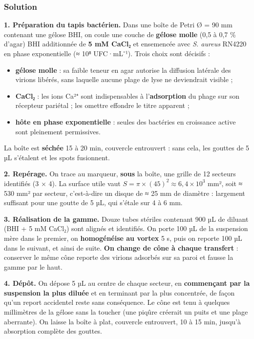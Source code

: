 \documentclass[11pt,a4paper]{article}
\providecommand{\tightlist}{\setlength{\itemsep}{0pt}\setlength{\parskip}{0pt}}
\begin{document}
\hypertarget{solution-3}{%
\subsubsection{Solution}\label{solution-3}}

\textbf{1. Préparation du tapis bactérien.} Dans une boîte de Petri Ø = 90 mm contenant une gélose BHI, on coule une couche de \textbf{gélose molle} (0,5 à 0,7 \% d'agar) BHI additionnée de \textbf{5 mM CaCl₂} et ensemencée avec \emph{S. aureus} RN4220 en phase exponentielle (≈ 10⁸ UFC·mL⁻¹). Trois choix sont décisifs :

\begin{itemize}
\tightlist
\item
  \textbf{gélose molle} : sa faible teneur en agar autorise la diffusion latérale des virions libérés, sans laquelle aucune plage de lyse ne deviendrait visible ;
\item
  \textbf{CaCl₂} : les ions Ca²⁺ sont indispensables à l'\textbf{adsorption} du phage sur son récepteur pariétal ; les omettre effondre le titre apparent ;
\item
  \textbf{hôte en phase exponentielle} : seules des bactéries en croissance active sont pleinement permissives.
\end{itemize}

La boîte est \textbf{séchée} 15 à 20 min, couvercle entrouvert : sans cela, les gouttes de 5 µL s'étalent et les spots fusionnent.

\textbf{2. Repérage.} On trace au marqueur, \textbf{sous} la boîte, une grille de 12 secteurs identifiés (3 × 4). La surface utile vaut \(S = \pi\times(45)^2 \approx 6{,}4\times10^{3}\) mm², soit ≈ 530 mm² par secteur, c'est-à-dire un disque de ≈ 25 mm de diamètre : largement suffisant pour une goutte de 5 µL, qui s'étale sur 4 à 6 mm.

\textbf{3. Réalisation de la gamme.} Douze tubes stériles contenant 900 µL de diluant (BHI + 5 mM CaCl₂) sont alignés et identifiés. On porte 100 µL de la suspension mère dans le premier, on \textbf{homogénéise au vortex} 5 s, puis on reporte 100 µL dans le suivant, et ainsi de suite. \textbf{On change de cône à chaque transfert} : conserver le même cône reporte des virions adsorbés sur sa paroi et fausse la gamme par le haut.

\textbf{4. Dépôt.} On dépose 5 µL au centre de chaque secteur, en \textbf{commençant par la suspension la plus diluée} et en terminant par la plus concentrée, de façon qu'un report accidentel reste sans conséquence. Le cône est tenu à quelques millimètres de la gélose sans la toucher (une piqûre créerait un puits et une plage aberrante). On laisse la boîte à plat, couvercle entrouvert, 10 à 15 min, jusqu'à absorption complète des gouttes.
\end{document}

